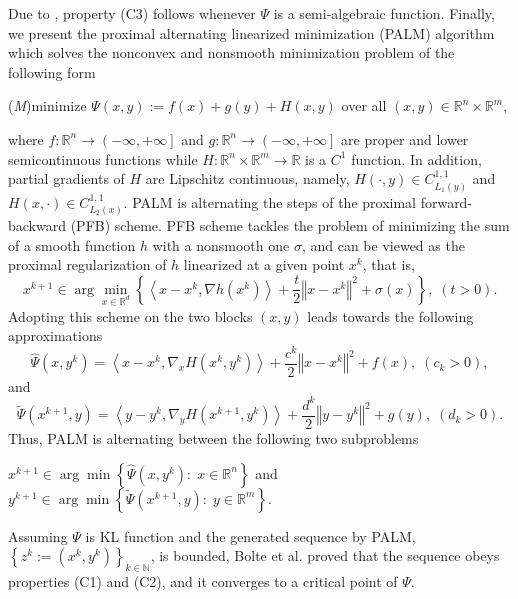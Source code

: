 \documentclass[12pt]{article}
\numberwithin{equation}{section}
\newcommand{\nn}{\mathbb{N}} %
\newcommand{\rr}{\mathbb{R}} %
\newcommand{\norm}[1]{\left\Vert {#1} \right\Vert} %
\begin{document}
Due to , property (C3) follows whenever $\Psi$ is a semi-algebraic function. Finally, we present the proximal alternating linearized minimization (PALM) algorithm which solves the nonconvex and nonsmooth minimization problem of the following form
\begin{center}
(\textit{M})\quad minimize $\Psi(x,y):=f(x)+g(y)+H(x,y)$ over all $(x,y) \in \mathbb{R}^n \times \mathbb{R}^m$,
\end{center}
where $f:\mathbb{R}^n \rightarrow \left(-\infty,+\infty\right]$ and $g:\mathbb{R}^n \rightarrow \left(-\infty,+\infty\right]$ are proper and lower semicontinuous functions while $H:\mathbb{R}^n \times \mathbb{R}^m \rightarrow \mathbb{R}$ is a $C^1$ function. In addition, partial gradients of $H$ are Lipschitz continuous, namely, $H(\cdot, y) \in C^{1,1}_{L_1(y)}$ and $H(x,\cdot) \in C^{1,1}_{L_2(x)}$.
PALM is alternating the steps of the proximal forward-backward (PFB) scheme. PFB scheme tackles the problem of minimizing the sum of a smooth function $h$ with a nonsmooth one $\sigma$, and can be viewed as the proximal regularization of $h$ linearized at a given point $x^k$, that is,
\begin{equation*}
	x^{k+1} \in \arg\!\min_{x \in \rr^d} \left\lbrace \left\langle x - x^k, \nabla h\left(x^k\right) \right\rangle + \frac{t}{2}\norm{x-x^k}^2 + \sigma(x)\right\rbrace,\; (t>0).
\end{equation*}
Adopting this scheme on the two blocks $(x,y)$ leads towards the following approximations 
\begin{equation*}
	\widehat{\Psi}\left(x,y^k\right) = \left\langle x-x^k, \nabla_x H\left( x^k, y^k \right)\right\rangle + \frac{c^k}{2}\norm{x-x^k}^2 + f(x), \; (c_k>0),
\end{equation*}
and
\begin{equation*}
	\widetilde{\Psi}\left(x^{k+1},y\right) = \left\langle y-y^k, \nabla_y H\left( x^{k+1}, y^k \right)\right\rangle + \frac{d^k}{2}\norm{y-y^k}^2 + g(y), \; (d_k>0).
\end{equation*}
Thus, PALM is alternating between the following two subproblems
\begin{center}
$x^{k+1} \in \arg\!\min \left\lbrace \widehat{\Psi}(x,y^k) : \; x \in \rr^n \right\rbrace$ \quad and \quad $y^{k+1} \in \arg\!\min \left\lbrace \widetilde{\Psi}\left(x^{k+1},y\right) : \; y \in \rr^m \right\rbrace$.
\end{center}
Assuming $\Psi$ is KL function and the generated sequence by PALM, $\left\lbrace z^k:=\left( x^k, y^k\right)\right\rbrace_{k \in \nn}$, is bounded, Bolte et al. \cite{BST2014} proved that the sequence obeys properties (C1) and (C2), and it converges to a critical point of $\Psi$. 
\end{document}
